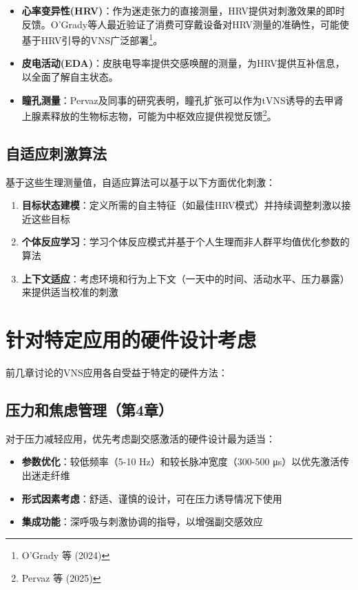 \documentclass[
  Letterpaper,
]{scrbook}
\providecommand{\tightlist}{%
  \setlength{\itemsep}{0pt}\setlength{\parskip}{0pt}}\usepackage{longtable,booktabs,array}
\begin{document}
\begin{itemize}
\item
  \textbf{心率变异性(HRV)}：作为迷走张力的直接测量，HRV提供对刺激效果的即时反馈。O'Grady等人最近验证了消费可穿戴设备对HRV测量的准确性，可能使基于HRV引导的VNS广泛部署\footnote{O'Grady
    等 (2024)}。
\item
  \textbf{皮电活动(EDA)}：皮肤电导率提供交感唤醒的测量，为HRV提供互补信息，以全面了解自主状态。
\item
  \textbf{瞳孔测量}：Pervaz及同事的研究表明，瞳孔扩张可以作为tVNS诱导的去甲肾上腺素释放的生物标志物，可能为中枢效应提供视觉反馈\footnote{Pervaz
    等 (2025)}。
\end{itemize}

\subsection{自适应刺激算法}\label{ux81eaux9002ux5e94ux523aux6fc0ux7b97ux6cd5}

基于这些生理测量值，自适应算法可以基于以下方面优化刺激：

\begin{enumerate}
\def\labelenumi{\arabic{enumi}.}
\item
  \textbf{目标状态建模}：定义所需的自主特征（如最佳HRV模式）并持续调整刺激以接近这些目标
\item
  \textbf{个体反应学习}：学习个体反应模式并基于个人生理而非人群平均值优化参数的算法
\item
  \textbf{上下文适应}：考虑环境和行为上下文（一天中的时间、活动水平、压力暴露）来提供适当校准的刺激
\end{enumerate}

\section{针对特定应用的硬件设计考虑}\label{ux9488ux5bf9ux7279ux5b9aux5e94ux7528ux7684ux786cux4ef6ux8bbeux8ba1ux8003ux8651}

前几章讨论的VNS应用各自受益于特定的硬件方法：

\subsection{压力和焦虑管理（第4章）}\label{ux538bux529bux548cux7126ux8651ux7ba1ux7406ux7b2c4ux7ae0}

对于压力减轻应用，优先考虑副交感激活的硬件设计最为适当：

\begin{itemize}
\tightlist
\item
  \textbf{参数优化}：较低频率（5-10 Hz）和较长脉冲宽度（300-500
  μs）以优先激活传出迷走纤维
\item
  \textbf{形式因素考虑}：舒适、谨慎的设计，可在压力诱导情况下使用
\item
  \textbf{集成功能}：深呼吸与刺激协调的指导，以增强副交感效应
\end{itemize}
\end{document}
